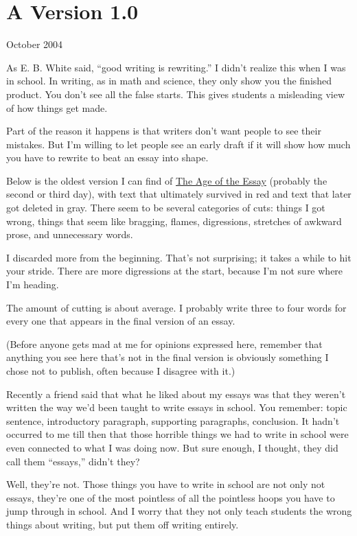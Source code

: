 \chapter{A Version 1.0}

October 2004

As E. B. White said, ``good writing is rewriting.'' I didn't realize
this when I was in school. In writing, as in math and science, they only
show you the finished product. You don't see all the false starts. This
gives students a misleading view of how things get made.

Part of the reason it happens is that writers don't want people to see
their mistakes. But I'm willing to let people see an early draft if it
will show how much you have to rewrite to beat an essay into shape.

Below is the oldest version I can find of \href{essay.html}{The Age of
the Essay} (probably the second or third day), with text that ultimately
survived in red and text that later got deleted in gray. There seem to
be several categories of cuts: things I got wrong, things that seem like
bragging, flames, digressions, stretches of awkward prose, and
unnecessary words.

I discarded more from the beginning. That's not surprising; it takes a
while to hit your stride. There are more digressions at the start,
because I'm not sure where I'm heading.

The amount of cutting is about average. I probably write three to four
words for every one that appears in the final version of an essay.

(Before anyone gets mad at me for opinions expressed here, remember that
anything you see here that's not in the final version is obviously
something I chose not to publish, often because I disagree with it.)

Recently a friend said that what he liked about my essays was that they
weren't written the way we'd been taught to write essays in school. You
remember: topic sentence, introductory paragraph, supporting paragraphs,
conclusion. It hadn't occurred to me till then that those horrible
things we had to write in school were even connected to what I was doing
now. But sure enough, I thought, they did call them ``essays,'' didn't
they?

Well, they're not. Those things you have to write in school are not only
not essays, they're one of the most pointless of all the pointless hoops
you have to jump through in school. And I worry that they not only teach
students the wrong things about writing, but put them off writing
entirely.

